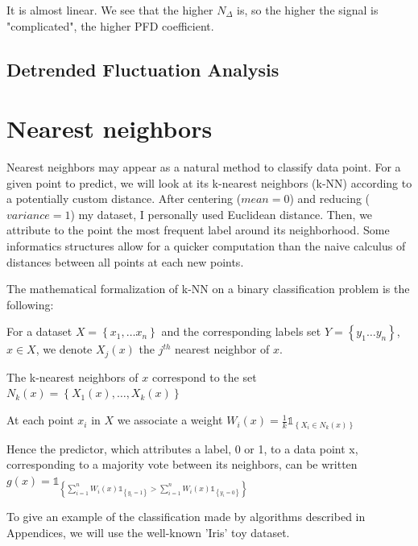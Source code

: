 \documentclass[12pt]{report}
\begin{document}
\begin{appendices}
It is almost linear. We see that the higher $N_{\Delta}$ is, so the higher the signal is "complicated", the higher PFD coefficient.

\section{Detrended Fluctuation Analysis}\label{section:Detrended Fluctuation Analysis}

\chapter{Nearest neighbors}\label{chap:Nearest neighbors}

Nearest neighbors may appear as a natural method to classify data point. For a given point to predict, we will look at its k-nearest neighbors (k-NN) according to a potentially custom distance. After centering ($mean = 0$) and reducing ($variance = 1$) my dataset, I personally used Euclidean distance. Then, we attribute to the point the most frequent label around its neighborhood. Some informatics structures allow for a quicker computation than the naive calculus of distances between all points at each new points.

The mathematical formalization of k-NN on a binary classification problem is the following:

For a dataset $X = \left\lbrace x_1, \ldots x_n \right\rbrace $ and the corresponding labels set $Y = \left\lbrace y_1 \ldots y_n \right\rbrace $,  $x \in X$, we denote $X_j (x)$ the $j^{th}$ nearest neighbor of $x$.

The k-nearest neighbors of $x$ correspond to the set $N_k(x) = \left\lbrace X_1(x), \ldots, X_k(x) \right\rbrace$

At each point $x_i$ in $X$ we associate a weight $W_i(x) = \frac{1}{k} \mathds{1}_{\left\lbrace X_i \in  N_k(x) \right\rbrace }$ 

Hence the predictor, which attributes a label, 0 or 1, to a data point x, corresponding to a majority vote between its neighbors, can be written $g(x) = \mathds{1}_{\left\lbrace \sum_{i=1}^{n} W_i(x) \mathds{1}_{\left\lbrace y_i = 1 \right\rbrace } > \sum_{i=1}^{n} W_i(x) \mathds{1}_{\left\lbrace y_i = 0 \right\rbrace }  \right\rbrace }$

\vspace{5mm}

To give an example of the classification made by algorithms described in Appendices, we will use the well-known 'Iris' toy dataset.


\end{appendices}
\end{document}
